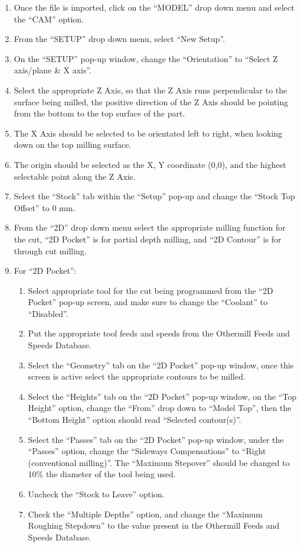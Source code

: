 \begin{enumerate}
\begin{enumerate}
			\item Once the file is imported, click on the “MODEL” drop down menu and select the “CAM” option.	
			\item From the “SETUP” drop down menu, select “New Setup”.
			\item On the “SETUP” pop-up window, change the “Orientation” to “Select Z axis/plane \& X axis”.
			\item Select the appropriate Z Axis, so that the Z Axis runs perpendicular to the surface being milled, the positive direction of the Z Axis should be pointing from the bottom to the top surface of the part.
			\item The X Axis should be selected to be orientated left to right, when looking down on the top milling surface.  
			\item The origin should be selected as the X, Y coordinate (0,0), and the highest selectable point along the Z Axis.
			\item Select the “Stock” tab within the “Setup” pop-up and change the “Stock Top Offset” to 0 mm. 
			\item From the “2D” drop down menu select the appropriate milling function for the cut, “2D Pocket” is for partial depth milling, and “2D Contour” is for through cut milling.
			\item For “2D Pocket”:
				\begin{enumerate}
					\item Select appropriate tool for the cut being programmed from the “2D Pocket” pop-up screen, and make sure to change the “Coolant” to “Disabled”.
					\item Put the appropriate tool feeds and speeds from the Othermill Feeds and Speeds Database.
					\item Select the “Geometry” tab on the “2D Pocket” pop-up window, once this screen is active select the appropriate contours to be milled.
					\item Select the “Heights” tab on the “2D Pocket” pop-up window, on the “Top Height” option, change the “From” drop down to “Model Top”, then the “Bottom Height” option should read “Selected contour(s)”.
					\item Select the “Passes” tab on the “2D Pocket” pop-up window, under the “Passes” option, change the “Sideways Compensations” to “Right (conventional milling)”.  The “Maximum Stepover” should be changed to 10\% the diameter of the tool being used.
					\item Uncheck the “Stock to Leave” option.
					\item Check the “Multiple Depths” option, and change the “Maximum Roughing Stepdown” to the value present in the Othermill Feeds and Speeds Database.

\end{enumerate}
\end{enumerate}
\end{enumerate}
